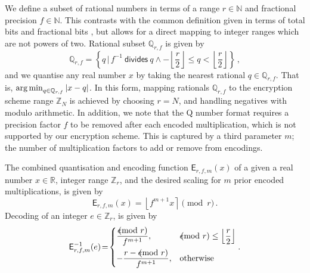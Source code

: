 \documentclass[twocolumn]{autart}
\begin{document}
We define a subset of rational numbers in terms of a range $r \in \mathbb{N}$ and fractional precision $f \in \mathbb{N}$. This contrasts with the common definition given in terms of total bits and fractional bits \cite{oberstarFixedPointRepresentationFractional2007,schulzedarupEncryptedCooperativeControl2019,farokhiSecurePrivateControl2017}, but allows for a direct mapping to integer ranges which are not powers of two. Rational subset $\mathbb{Q}_{r,f}$ is given by
\begin{equation}
    \mathbb{Q}_{r,f} = \left\{q \,|\, f^{-1}\ \textsf{divides}\ q \wedge -\left\lfloor\frac{r}{2}\right\rfloor \leq q < \left\lfloor\frac{r}{2}\right\rfloor \right\}\,,
\end{equation}
and we quantise any real number $x$ by taking the nearest rational $q \in \mathbb{Q}_{r,f}$. That is, $\operatorname*{arg\,min}_{q\in\mathbb{Q}_{r,f}} |x-q|$. In this form, mapping rationals $\mathbb{Q}_{r,f}$ to the encryption scheme range $\mathbb{Z}_N$ is achieved by choosing $r=N$, and handling negatives with modulo arithmetic. In addition, we note that the Q number format requires a precision factor $f$ to be removed after each encoded multiplication, which is not supported by our encryption scheme. This is captured by a third parameter $m$; the number of multiplication factors to add or remove from encodings.

The combined quantisation and encoding function $\mathsf{E}_{r,f,m}(x)$ of a given a real number $x \in \mathbb{R}$, integer range $\mathbb{Z}_r$, and the desired scaling for $m$ prior encoded multiplications, is given by
\begin{equation}
    \mathsf{E}_{r,f,m}(x) = \left\lfloor f^{m+1} x \right\rceil \pmod{r}\,. \label{eqn:encode}
\end{equation}
Decoding of an integer $e \in \mathbb{Z}_r$, is given by
\begin{equation}
    \mathsf{E}^{-1}_{r,f,m}(e) \!=\! 
    \begin{dcases}
        \frac{e\hspace{-8pt}\pmod{r}}{f^{m+1}}, &e\hspace{-8pt}\pmod{r} \leq \left\lfloor\frac{r}{2}\right\rfloor \\
        -\frac{r - e\hspace{-8pt}\pmod{r}}{f^{m+1}}, &\text{otherwise} \\
    \end{dcases}.\label{eqn:decode}
\end{equation}
\end{document}
